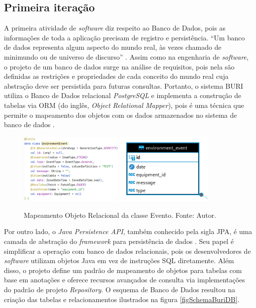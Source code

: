 \subsection{Primeira iteração}\label{ExecAtv1It}

A primeira atividade de \textit{software} diz respeito ao Banco de Dados, pois as informações de toda a aplicação 
precisam de registro e persistência. ``Um banco de dados representa algum aspecto do mundo real, às vezes chamado de minimundo ou de universo de discurso'' \cite[pp. 3]{banco-de-dados-navathe2014}. Assim como na engenharia de \textit{software}, o projeto 
de um banco de dados surge na análise de requisitos, pois nela são definidas as restrições e propriedades de cada conceito do mundo real cuja abstração 
deve ser persistida para futuras consultas. Portanto, o sistema BURI utiliza o Banco de Dados relacional \textit{PostgreSQL} e implementa a construção de tabelas 
via ORM (do inglês, \textit{Object Relational Mapper}), pois é uma técnica que permite o mapeamento dos objetos com os dados armazenados no sistema de banco de dados \cite{hibernate-documentation}. 

\begin{figure}[ht]
    \centering
    \includegraphics[width=0.45\textwidth]{img/event-class-kotlin.png}
    \hfill
    \includegraphics[width=0.42\textwidth]{img/event-table-postgres.png}
    \caption{Mapeamento Objeto Relacional da classe Evento. Fonte: Autor.}\label{figJpaEvent}
\end{figure}

Por outro lado, o \textit{Java Persistence API}, também conhecido pela sigla JPA, é uma camada 
de abstração do \textit{framework} para persistência de dados \cite{spring-data-jpa-documentation}. Seu papel 
é simplificar a operação com banco de dados relacionais, pois os desenvolvedores de \textit{software} utilizam objetos Java 
em vez de instruções SQL diretamente. Além disso, o projeto define um padrão de mapeamento de objetos para tabelas com base em anotações e
oferece recursos avançados de consulta via implementações do padrão de projeto \textit{Repository}. O esquema de Banco de Dados resultou na criação das 
tabelas e relacionamentos ilustrados na figura \ref{figSchemaBuriDB}.

